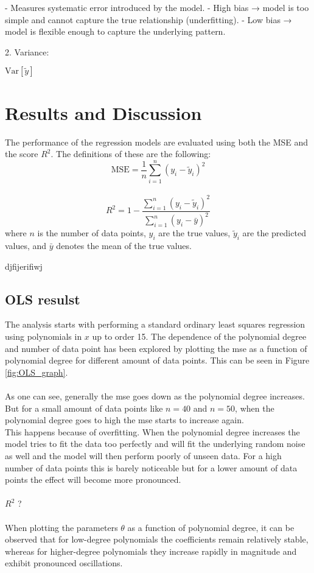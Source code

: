 \documentclass[%
 reprint,            %
 amsmath,amssymb,
 aps,
]{revtex4-2}
\begin{document}
  - Measures systematic error introduced by the model.  
  - High bias → model is too simple and cannot capture the true relationship (underfitting).  
  - Low bias → model is flexible enough to capture the underlying pattern.

 2. Variance:
 
 $\mathrm{Var}[\tilde y]$



\section{Results and Discussion}
The performance of the regression models are evaluated using both the MSE and the score $R^2$. The definitions of these are the following:
$$ \mathrm{MSE} = \frac{1}{n} \sum_{i=1}^{n} \left( y_i - \tilde{y}_i \right)^2$$\\
$$R^2 = 1 - \frac{\sum_{i=1}^{n} \left( y_i - \tilde{y}_i \right)^2}{\sum_{i=1}^{n} \left( y_i - \bar{y} \right)^2}$$
where $n$ is the number of data points, $y_i$ are the true values, $\tilde{y}_i$ are the predicted values, and $\bar{y}$ denotes the mean of the true values.

djfijerifiwj
\subsection{OLS resulst}

The analysis starts with performing a standard ordinary least squares regression using polynomials in $x$ up to order 15. The dependence of the polynomial degree and number of data point has been explored by plotting the mse as a function of polynomial degree for different amount of data points. This can be seen in Figure \ref{fig:OLS_graph}.\\\\
As one can see, generally the mse goes down as the polynomial degree increases. But for a small amount of data points like $n = 40$ and $n = 50$, when the polynomial degree goes to high the mse starts to increase again.\\
This happens because of overfitting. When the polynomial degree increases the model tries to fit the data too perfectly and will fit the underlying random noise as well and the model will then perform poorly of unseen data. For a high number of data points this is barely noticeable but for a lower amount of data points the effect will become more pronounced.\\\\
$R^2$ ?\\\\
When plotting the parameters $\theta$ as a function of polynomial degree, it can be observed that for low-degree polynomials the coefficients remain relatively stable, whereas for higher-degree polynomials they increase rapidly in magnitude and exhibit pronounced oscillations.
    
\end{document}
